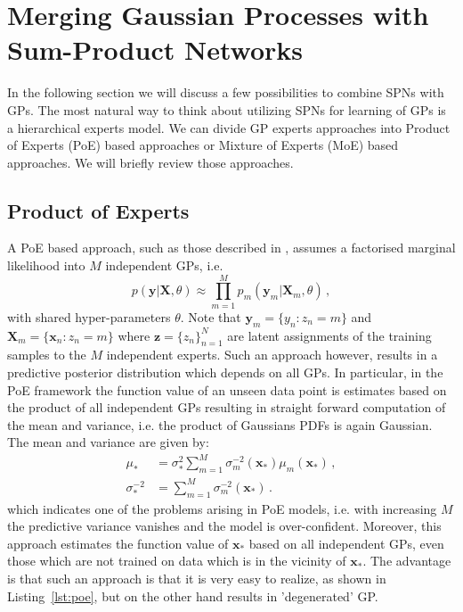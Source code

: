 \documentclass[10pt,letterpaper]{article}
\newcommand{\X}{\mathbf{X}}
\newcommand{\x}{\mathbf{x}}
\newcommand{\y}{\mathbf{y}}
\newcommand{\xn}{\mathbf{x}_{n}}
\newcommand{\new}{_{*}}
\theoremstyle{mystyle}
\begin{document}
\section{Merging Gaussian Processes with Sum-Product Networks}
In the following section we will discuss a few possibilities to combine SPNs with GPs.
The most natural way to think about utilizing SPNs for learning of GPs is a hierarchical experts model.
We can divide GP experts approaches into Product of Experts (PoE) based approaches or Mixture of Experts (MoE) based approaches. We will briefly review those approaches.
\subsection{Product of Experts}
A PoE based approach, such as those described in \cite{Deisenroth2015}, assumes a factorised marginal likelihood into $M$ independent GPs, i.e.
\[
  p(\y | \X, \theta) \approx \prod_{m=1}^M p_m(\y_m | \X_m, \theta) \, ,
\]
with shared hyper-parameters $\theta$. Note that $\y_m = \{y_n : z_n = m\}$ and $\X_m = \{\xn : z_n = m\}$ where $\bm z = \{z_n\}_{n=1}^N$ are latent assignments of the training samples to the $M$ independent experts.
Such an approach however, results in a predictive posterior distribution which depends on all GPs.
In particular, in the PoE framework the function value of an unseen data point is estimates based on the product of all independent GPs resulting in straight forward computation of the mean and variance, i.e. the product of  Gaussians PDFs is again Gaussian.
The mean and variance are given by:
\begin{align}
  \mu\new &= \sigma\new^2 \sum_{m=1}^M \sigma_m^{-2}(\x\new) \mu_m(\x\new) \, , \\
  \sigma\new^{-2} &= \sum_{m=1}^M \sigma_m^{-2}(\x\new) \, .
\end{align}
which indicates one of the problems arising in PoE models, i.e. with increasing $M$ the predictive variance vanishes and the model is over-confident. 
Moreover, this approach estimates the function value of $\x\new$ based on all independent GPs, even those which are not trained on data which is in the vicinity of $\x\new$.
The advantage is that such an approach is that it is very easy to realize, as shown in Listing~\ref{lst:poe}, but on the other hand results in 'degenerated' GP.
\end{document}
